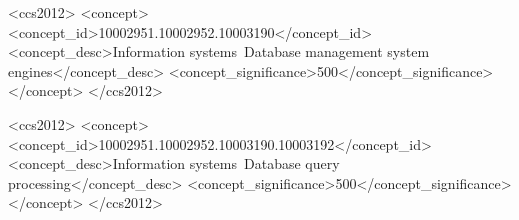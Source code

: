 \documentclass[sigconf]{acmart}
\begin{document}
%
%
\begin{CCSXML}
	<ccs2012>
	<concept>
	<concept_id>10002951.10002952.10003190</concept_id>
	<concept_desc>Information systems~Database management system engines</concept_desc>
	<concept_significance>500</concept_significance>
	</concept>
	</ccs2012>
\end{CCSXML}
\begin{CCSXML}
	<ccs2012>
	<concept>
	<concept_id>10002951.10002952.10003190.10003192</concept_id>
	<concept_desc>Information systems~Database query processing</concept_desc>
	<concept_significance>500</concept_significance>
	</concept>
	</ccs2012>
\end{CCSXML}

%

\maketitle












%



\end{document}

